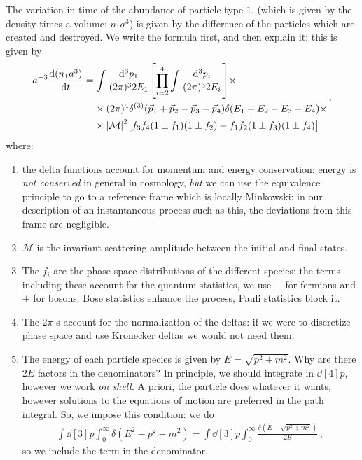 \documentclass[main.tex]{subfiles}
\begin{document}
The variation in time of the abundance of particle type \(1\), (which is given by the density times a volume: \(n_1 a^3\)) is given by the difference of the particles which are created and destroyed.
We write the formula first, and then explain it: this is given by
%
\begin{subequations}
\begin{align}
\begin{split}
a^{-3} \dv{(n_1 a^3)}{t}
&= \int \frac{ \dd[3]{p_{1}} }{(2 \pi )^3 2 E_1} \qty[\prod_{i=2}^{4}
\int \frac{ \dd[3]{p_{i}} }{(2 \pi )^3 2 E_i}] \times \\
&\phantom{=}\ 
\times (2 \pi )^{4} \delta^{(3)} (\vec{p}_{1} + \vec{p}_{2} - \vec{p}_{3} - \vec{p}_{4})
\delta (E_1 + E_2 - E_3 - E_4 )  \times \\
&\phantom{=}\ 
\times 
\abs{\mathcal{M}}^2
\qty[f_3 f_4 \qty(1 \pm f_1 ) \qty(1 \pm f_2 ) - f_1 f_2 \qty(1 \pm f_3 ) \qty(1 \pm f_4 )]
\end{split}
\,,
\end{align}
\end{subequations}
%
where:
\begin{enumerate}
  \item the delta functions account for momentum and energy conservation: energy is \emph{not conserved} in general in cosmology, \emph{but} we can use the equivalence principle to go to a reference frame which is locally Minkowski: in our description of an instantaneous process such as this, the deviations from this frame are negligible.
  \item \(\mathcal{M}\) is the invariant scattering amplitude between the initial and final states. 
  \item The \(f_{i}\) are the phase space distributions of the different species: the terms including these account for the quantum statistics, we use \(-\) for fermions and \(+\) for bosons. Bose statistics enhance the process, Pauli statistics block it. 
  \item The \(2\pi \)-s account for the normalization of the deltas: if we were to discretize phase space and use Kronecker deltas we would not need them. 
  \item The energy of each particle species is given by  \(E = \sqrt{p^2+m^2}\). 
  Why are there \(2E\) factors in the denominators? In principle, we should integrate in \(\dd[4]{p}\), however we work \emph{on shell}. A priori, the particle does whatever it wants, however solutions to the equations of motion are preferred in the path integral. So, we impose this condition: we do 
  \begin{align}
  \int \dd[3]{p} \int_{0}^{ \infty } \delta (E^2- p^2-m^2) 
  = \int \dd[3]{p} \int_{0}^{ \infty } \frac{ \delta (E - \sqrt{p^2+m^2})}{2E}
  \,,
  \end{align}
  so we include the term in the denominator. 
\end{enumerate}
\end{document}
